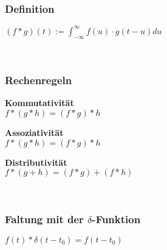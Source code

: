 \subsubsection[Definition]{Definition}
\begin{minipage}{0.4\textwidth}
		\begin{framed}
			\centering
			$(f * g)(t):=\int_{-\infty}^{\infty} f(u) \cdot g(t-u) d u$
		\end{framed}
\end{minipage}\\
%
\subsubsection[Rechenregeln]{Rechenregeln}
	\begin{minipage}{0.33\textwidth}
		\textbf{Kommutativität}\\
		$f *(g * h)=(f * g) * h$
	\end{minipage}
%
	\begin{minipage}{0.33\textwidth}
		\textbf{Assoziativität}\\
		$f *(g * h)=(f * g) * h$
	\end{minipage}
%
	\begin{minipage}{0.33\textwidth}
		\textbf{Distributivität}\\
		$f *(g+h)=(f * g)+(f * h)$
	\end{minipage}\\
%
\subsubsection[Faltung mit der $\delta$-Funktion]{Faltung mit der $\delta$-Funktion}
\begin{minipage}{0.5\textwidth}
	$f(t) * \delta\left(t-t_{0}\right)=f\left(t-t_{0}\right)$
\end{minipage}